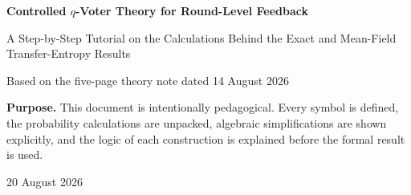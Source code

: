 \documentclass[11pt,a4paper]{article}
\newcommand{\Adv}{\ensuremath{\mathrm{Advocate}}}
\newcommand{\NoOp}{\ensuremath{\mathrm{NoOp}}}
\newcommand{\1}{\mathbbm{1}}
\begin{document}
\begin{titlepage}
\centering
\vspace*{2.2cm}
{\Huge\bfseries Controlled $q$-Voter Theory for Round-Level Feedback\par}
\vspace{0.4cm}
{\LARGE A Step-by-Step Tutorial on the Calculations Behind the Exact and Mean-Field Transfer-Entropy Results\par}
\vspace{1.4cm}
{\large Based on the five-page theory note dated 14 August 2026\par}
\vspace{1.0cm}
\begin{tcolorbox}[width=0.84\textwidth,colback=softblue,colframe=deepblue,arc=2mm]
\centering
\textbf{Purpose.} This document is intentionally pedagogical. Every symbol is defined, the probability calculations are unpacked, algebraic simplifications are shown explicitly, and the logic of each construction is explained before the formal result is used.
\end{tcolorbox}
\vfill
{\large 20 August 2026\par}
\end{titlepage}

\begin{abstract}
This tutorial derives, step by step, the controlled unanimity $q$-voter model with round-level feedback and the transfer-entropy quantities reported in the source theory note. The population consists of $N$ binary agents. At the start of each round, a controller samples $q_c$ agents, chooses either \NoOp{} or \Adv{} through a soft sigmoid policy, and, if it advocates target opinion $A$, replaces one of the $q$ social-input slots at exactly $b$ of the $N$ microscopic update positions. We first derive the ordinary and controlled one-update kernels $K_0$ and $K_1$, then construct the exact whole-round kernels $R_0$ and $R_1$, including the dynamic-programming recursion that averages exactly over all uniformly preallocated control schedules. We then derive the exact finite-$N$ local transfer entropy $T(n)=I(U_k;N_{k+1}\mid N_k=n)$ and show why it is a weighted Jensen--Shannon divergence. Finally, we derive the large-$N$, weak-control approximation and the analytically stronger $q=1$ special case, explaining the $c^2$ control-budget scaling and the boundary distinction $q=1:T(0)>0$ versus $q\ge2:T(0)=0$. Reproduced theory curves are included to connect every expression to the reported results.
\end{abstract}
\end{document}

